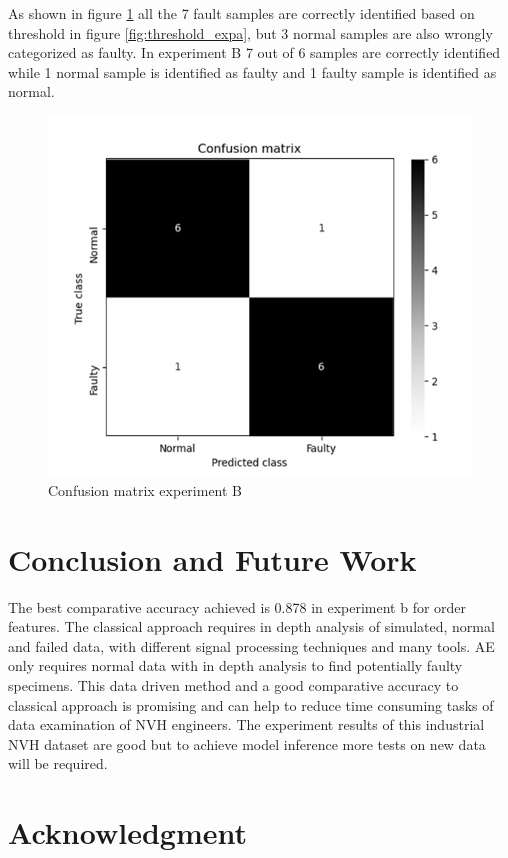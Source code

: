 \documentclass[conference]{IEEEtran}
\begin{document}
As shown in figure \ref{fig:conf_matrix_expb} all the 7 fault samples are correctly identified based on threshold in figure \ref{fig:threshold_expa}, but 3 normal samples are also wrongly categorized as faulty. In experiment B 7 out of 6 samples are correctly identified while 1 normal sample is identified as faulty and 1 faulty sample is identified as normal.    

\begin{figure}[htbp]
\centerline{\includegraphics[scale=0.5]{conf_matrix_order.png}}
\caption{Confusion matrix experiment B}
\label{fig:conf_matrix_expb}
\end{figure}
\FloatBarrier
\section{Conclusion and Future Work}
The best comparative accuracy achieved is 0.878 in experiment b for order features. The classical approach requires in depth analysis of simulated, normal and failed data, with different signal processing techniques and many tools. AE only requires normal data with in depth analysis to find potentially faulty specimens. This data driven method and a good comparative accuracy to classical approach is promising and can help to reduce time consuming tasks of data examination of NVH engineers. The experiment results of this industrial NVH dataset are good but to achieve model inference more tests on new data will be required.   

\section*{Acknowledgment}
\end{document}
